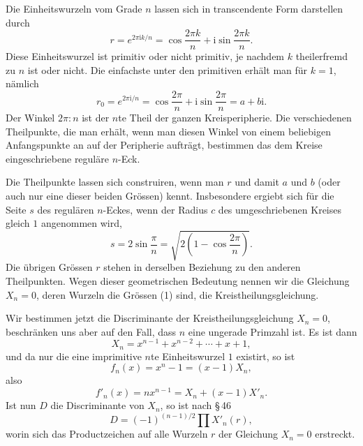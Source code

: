 \documentclass[11pt]{article}
\providecommand{\ii}{\mathrm{i}}
\begin{document}
Die Einheitswurzeln vom Grade $n$ lassen sich in transcendente Form darstellen durch
\[
\tag{1}        r=e^{2\pi \ii k/n}=\cos\frac{2\pi k}{n}+\ii\sin\frac{2\pi k}{n}.
\]
Diese Einheitswurzel ist primitiv oder nicht primitiv, je nachdem $k$ theilerfremd zu $n$ ist oder nicht. Die einfachste unter den primitiven erhält man für $k=1$, nämlich
\[
\tag{2}        r_0=e^{2\pi \ii/n}=\cos\frac{2\pi}{n}+\ii\sin\frac{2\pi}{n}=a+b\ii.
\]
Der Winkel $2\pi:n$ ist der $n$te Theil der ganzen Kreisperipherie. Die verschiedenen Theilpunkte, die man erhält, wenn man diesen Winkel von einem beliebigen Anfangspunkte an auf der Peripherie aufträgt, bestimmen das dem Kreise eingeschriebene reguläre $n$-Eck.

\begin{figure}[h]
\centering
{}
\par{}
\end{figure}

Die Theilpunkte lassen sich construiren, wenn man $r$ und damit $a$ und $b$ (oder auch nur eine dieser beiden Grössen) kennt. Insbesondere ergiebt sich für die Seite $s$ des regulären $n$-Eckes, wenn der Radius $c$ des umgeschriebenen Kreises gleich $1$ angenommen wird,
\[
        s=2\sin\frac{\pi}{n}=\sqrt{2\left(1-\cos\frac{2\pi}{n}\right)}.
\]
Die übrigen Grössen $r$ stehen in derselben Beziehung zu den anderen Theilpunkten. Wegen dieser geometrischen Bedeutung nennen wir die Gleichung $X_n=0$, deren Wurzeln die Grössen (1) sind, die Kreistheilungsgleichung.

Wir bestimmen jetzt die Discriminante der Kreistheilungsgleichung $X_n=0$, beschränken uns aber auf den Fall, dass $n$ eine ungerade Primzahl ist. Es ist dann
\[
\tag{3}        X_n=x^{n-1}+x^{n-2}+\cdots+x+1,
\]
und da nur die eine imprimitive $n$te Einheitswurzel $1$ existirt, so ist
\[
\tag{4}        f_n(x)=x^n-1=(x-1)X_n,
\]
also
\[
\tag{5}        f'_n(x)=nx^{n-1}=X_n+(x-1)X'_n.
\]
Ist nun $D$ die Discriminante von $X_n$, so ist nach \S\,46
\[
\tag{6}        D=(-1)^{(n-1)/2}\prod X'_n(r),
\]
worin sich das Productzeichen auf alle Wurzeln $r$ der Gleichung $X_n=0$ erstreckt.
\end{document}
